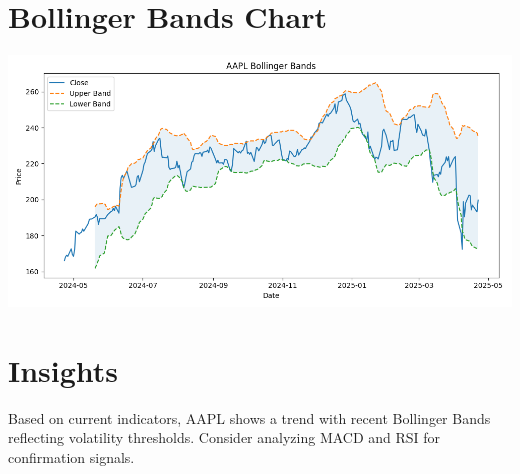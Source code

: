 \documentclass{article}
\begin{document}
\section*{Bollinger Bands Chart}
\includegraphics[width=\textwidth]{bollinger_plot.png}

\section*{Insights}
Based on current indicators, AAPL shows a trend with recent Bollinger Bands reflecting volatility thresholds. Consider analyzing MACD and RSI for confirmation signals.
\end{document}
